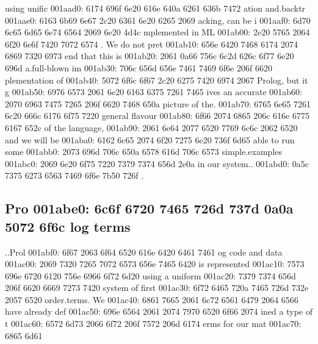 \begin{bo
00010e0: 7865 647d 5c62 6567 696e 7b76 6572 6261  xed}
\begin{verba
00010f0: 7469 6d7d 0a20 2023 7479 7065 2074 6572  tim}
\begin{
0001c40: 7665 7262 6174 696d 7d0a 2020 236c 6574  verbatim}
\begin{boxe
00027a0: 647d 5c62 6567 696e 7b76 6572 6261 7469  d}
\begin{verbati
00027b0: 6d7d 0a20 2023 6c65 7420 696e 6669 7865  m}
\begin{v
0002c60: 6572 6261 7469 6d7d 0a20 2023 6c65 7420  erbatim}
\begin{
0002dc0: 7665 7262 6174 696d 7d0a 2020 236c 6574  verbatim}
\begin{boxed
0002f30: 7d5c 6265 6769 6e7b 7665 7262 6174 696d  }
\begin{verbatim
0002f40: 7d0a 2020 236c 6574 2068 6428 683a 3a74  }
\begin{v
0003e60: 6572 6261 7469 6d7d 0a20 2023 236f 7065  erbatim}
\begin{boxed
00042b0: 7d5c 6265 6769 6e7b 7665 7262 6174 696d  }
\begin{verbatim
00042c0: 7d0a 2020 2328 782c 7429 3b3b 0a20 202d  }
\begin{box
000a870: 6564 7d5c 6265 6769 6e7b 6c73 746c 6973  ed}
\begin{lstlis
000a880: 7469 6e67 7d0a 2020 6578 6365 7074 696f  ting}
\begin{verb
000ade0: 6174 696d 7d0a 2020 6c65 7420 7265 6320  atim}
\begin{boxed
000c0b0: 7d5c 6265 6769 6e7b 6c73 746c 6973 7469  }
\begin{lstlisti
000c0c0: 6e67 7d0a 2020 6c65 7420 7061 7273 6572  ng}
\begin{lstl
0014610: 6973 7469 6e67 7d0a 2020 6c65 7420 7265  isting}
\begin{ls
0015df0: 746c 6973 7469 6e67 7d0a 2020 6c65 7420  tlisting}
\begin{lstlistin
00176e0: 677d 0a20 206c 6574 206d 7364 203d 0a20  g}
using unific
001aad0: 6174 696f 6e20 616e 640a 6261 636b 7472  ation and.backtr
001aae0: 6163 6b69 6e67 2c20 6361 6e20 6265 2069  acking, can be i
001aaf0: 6d70 6c65 6d65 6e74 6564 2069 6e20 4d4c  mplemented in ML
001ab00: 2e20 5765 2064 6f20 6e6f 7420 7072 6574  . We do not pret
001ab10: 656e 6420 7468 6174 2074 6869 7320 6973  end that this is
001ab20: 2061 0a66 756c 6c2d 626c 6f77 6e20 696d   a.full-blown im
001ab30: 706c 656d 656e 7461 7469 6f6e 206f 6620  plementation of 
001ab40: 5072 6f6c 6f67 2c20 6275 7420 6974 2067  Prolog, but it g
001ab50: 6976 6573 2061 6e20 6163 6375 7261 7465  ives an accurate
001ab60: 2070 6963 7475 7265 206f 6620 7468 650a   picture of the.
001ab70: 6765 6e65 7261 6c20 666c 6176 6f75 7220  general flavour 
001ab80: 6f66 2074 6865 206c 616e 6775 6167 652c  of the language,
001ab90: 2061 6e64 2077 6520 7769 6c6c 2062 6520   and we will be 
001aba0: 6162 6c65 2074 6f20 7275 6e20 736f 6d65  able to run some
001abb0: 2073 696d 706c 650a 6578 616d 706c 6573   simple.examples
001abc0: 2069 6e20 6f75 7220 7379 7374 656d 2e0a   in our system..
001abd0: 0a5c 7375 6273 6563 7469 6f6e 7b50 726f  .\subsection{Pro
001abe0: 6c6f 6720 7465 726d 737d 0a0a 5072 6f6c  log terms}..Prol
001abf0: 6f67 2063 6f64 6520 616e 6420 6461 7461  og code and data
001ac00: 2069 7320 7265 7072 6573 656e 7465 6420   is represented 
001ac10: 7573 696e 6720 6120 756e 6966 6f72 6d20  using a uniform 
001ac20: 7379 7374 656d 206f 6620 6669 7273 7420  system of first 
001ac30: 6f72 6465 720a 7465 726d 732e 2057 6520  order.terms. We 
001ac40: 6861 7665 2061 6c72 6561 6479 2064 6566  have already def
001ac50: 696e 6564 2061 2074 7970 6520 6f66 2074  ined a type of t
001ac60: 6572 6d73 2066 6f72 206f 7572 206d 6174  erms for our mat
001ac70: 6865 6d61 
\end{lstlistin
00176e0: 677d 0a20 206c 6574 206d 7364 203d 0a20  g}
\end{ls
0015df0: 746c 6973 7469 6e67 7d0a 2020 6c65 7420  tlisting}
\end{lstl
0014610: 6973 7469 6e67 7d0a 2020 6c65 7420 7265  isting}
\end{lstlisti
000c0c0: 6e67 7d0a 2020 6c65 7420 7061 7273 6572  ng}
\end{boxed
000c0b0: 7d5c 6265 6769 6e7b 6c73 746c 6973 7469  }
\end{verb
000ade0: 6174 696d 7d0a 2020 6c65 7420 7265 6320  atim}
\end{lstlis
000a880: 7469 6e67 7d0a 2020 6578 6365 7074 696f  ting}
\end{box
000a870: 6564 7d5c 6265 6769 6e7b 6c73 746c 6973  ed}
\end{verbatim
00042c0: 7d0a 2020 2328 782c 7429 3b3b 0a20 202d  }
\end{boxed
00042b0: 7d5c 6265 6769 6e7b 7665 7262 6174 696d  }
\end{v
0003e60: 6572 6261 7469 6d7d 0a20 2023 236f 7065  erbatim}
\end{verbatim
0002f40: 7d0a 2020 236c 6574 2068 6428 683a 3a74  }
\end{boxed
0002f30: 7d5c 6265 6769 6e7b 7665 7262 6174 696d  }
\end{
0002dc0: 7665 7262 6174 696d 7d0a 2020 236c 6574  verbatim}
\end{v
0002c60: 6572 6261 7469 6d7d 0a20 2023 6c65 7420  erbatim}
\end{verbati
00027b0: 6d7d 0a20 2023 6c65 7420 696e 6669 7865  m}
\end{boxe
00027a0: 647d 5c62 6567 696e 7b76 6572 6261 7469  d}
\end{
0001c40: 7665 7262 6174 696d 7d0a 2020 236c 6574  verbatim}
\end{verba
00010f0: 7469 6d7d 0a20 2023 7479 7065 2074 6572  tim}
\end{bo
00010e0: 7865 647d 5c62 6567 696e 7b76 6572 6261  xed}
